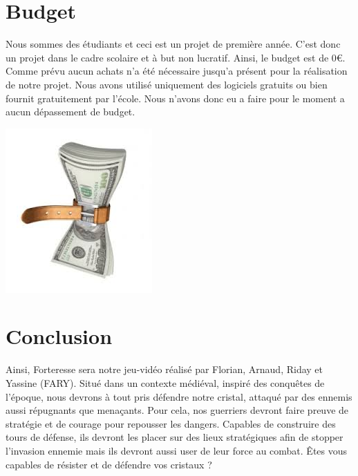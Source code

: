 \documentclass[a4paper, 12pt]{article}
\begin{document}
\section{Budget}

Nous sommes des étudiants et ceci est un projet de première année. C'est donc un projet dans le cadre scolaire et à but non lucratif. Ainsi, le budget est de 0\euro{}. Comme prévu aucun achats n'a été nécessaire jusqu'a présent pour la réalisation de notre projet. Nous avons utilisé uniquement des logiciels gratuits ou bien fournit gratuitement par l'école. Nous n'avons donc eu a faire pour le moment a aucun dépassement de budget.\\
\centerline{\includegraphics[scale=0.7]{images.jpg}}

\section{Conclusion}

Ainsi, Forteresse sera notre jeu-vidéo réalisé par Florian, Arnaud, Riday et Yassine (FARY). Situé dans un contexte médiéval, inspiré des conquêtes de l’époque, nous devrons à tout pris défendre notre cristal, attaqué par des ennemis aussi répugnants que menaçants. Pour cela, nos guerriers devront faire preuve de stratégie et de courage pour repousser les dangers. Capables de construire des tours de défense, ils devront les placer sur des lieux stratégiques afin de stopper l’invasion ennemie mais ils devront aussi user de leur force au combat.
Êtes vous capables de résister et de défendre vos cristaux ?
\end{document}
